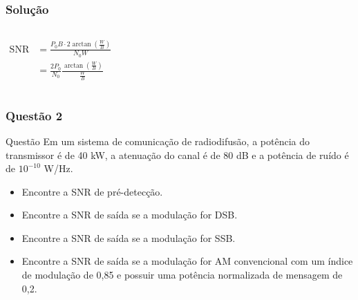 \documentclass{beamer}
\begin{document}
\begin{frame}
  \frametitle{Solução}

  \begin{columns}
    \begin{align*}
      \text{SNR} &= \frac{P_0 B \cdot 2 \arctan\left(\frac{W}{B}\right)}{N_0 W} \\
      &= \frac{2P_0}{N_0} \frac{\arctan\left(\frac{W}{B}\right)}{\frac{W}{B}}
    \end{align*}
    \begin{figure}
      \centering 
  
  
  
    \end{figure}
    \end{columns}    
\end{frame}


\begin{frame}
  \frametitle{Questão 2}

  \begin{block}{Questão}
    Em um sistema de comunicação de radiodifusão, a 
    potência do transmissor é de 40 \si{\kilo\watt}, a atenuação do canal é de 80 dB e a
     potência de ruído é de $10^{-10}$ W/Hz.

     \begin{itemize}
      \item Encontre a SNR de pré-detecção.
      \item Encontre a SNR de saída se a modulação for DSB.
      \item Encontre a SNR de saída se a modulação for SSB.
      \item Encontre a SNR de saída se a modulação for AM convencional com um índice de modulação de 0,85 e possuir uma potência normalizada de mensagem de 0,2.
      \end{itemize}
  \end{block}

\end{frame}
\end{document}
